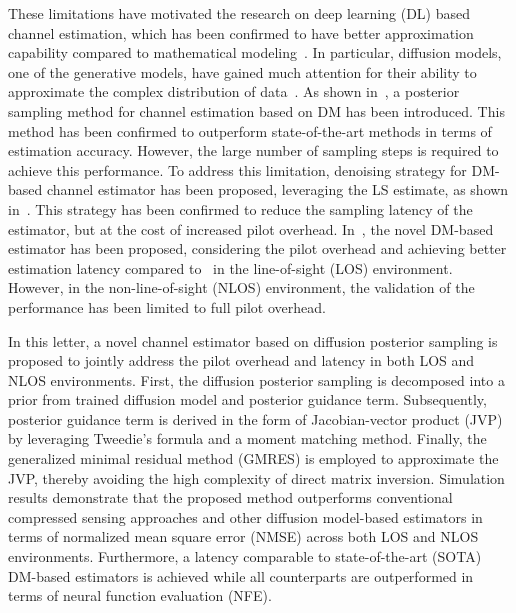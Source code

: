 \documentclass[lettersize,journal]{IEEEtran}
\begin{document}
These limitations have motivated the research on deep learning (DL) based channel estimation, which has been confirmed to have better approximation capability compared to mathematical modeling~\cite{kimDeepLearningaidedWireless2023, heDeepLearningBasedChannel2018}. In particular, diffusion models, one of the generative models, have gained much attention for their ability to approximate the complex distribution of data~\cite{arvinteMIMOChannelEstimation2023,feslDiffusionBasedGenerativePrior2024,zhouGenerativeDiffusionModels2025}. As shown in~\cite{arvinteMIMOChannelEstimation2023}, a posterior sampling method for channel estimation based on DM has been introduced. This method has been confirmed to outperform state-of-the-art methods in terms of estimation accuracy. However, the large number of sampling steps is required to achieve this performance. To address this limitation, denoising strategy for DM-based channel estimator has been proposed, leveraging the LS estimate, as shown in~\cite{feslDiffusionBasedGenerativePrior2024}. This strategy has been confirmed to reduce the sampling latency of the estimator, but at the cost of increased pilot overhead. In~\cite{zhouGenerativeDiffusionModels2025}, the novel DM-based estimator has been proposed, considering the pilot overhead and achieving better estimation latency compared to~\cite{arvinteMIMOChannelEstimation2023} in the line-of-sight (LOS) environment. However, in the non-line-of-sight (NLOS) environment, the validation of the performance has been limited to full pilot overhead.

In this letter, a novel channel estimator based on diffusion posterior sampling is proposed to jointly address the pilot overhead and latency in both LOS and NLOS environments. First, the diffusion posterior sampling is decomposed into a prior from trained diffusion model and posterior guidance term. Subsequently, posterior guidance term is derived in the form of Jacobian-vector product (JVP) by leveraging Tweedie’s formula and a moment matching method. Finally, the generalized minimal residual method (GMRES) is employed to approximate the JVP, thereby avoiding the high complexity of direct matrix inversion. Simulation results demonstrate that the proposed method outperforms conventional compressed sensing approaches and other diffusion model-based estimators in terms of normalized mean square error (NMSE) across both LOS and NLOS environments. Furthermore, a latency comparable to state-of-the-art (SOTA) DM-based estimators is achieved while all counterparts are outperformed in terms of neural function evaluation (NFE).
\end{document}
